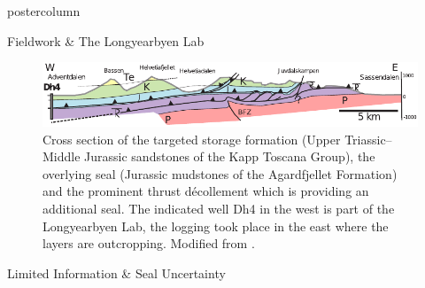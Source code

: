 \documentclass{beamer}
\begin{document}
\begin{frame}
\begin{columns}
\begin{column}{.618\textwidth}
\begin{beamercolorbox}[center]{postercolumn}
\begin{minipage}{.98\textwidth}
{\begin{myblock}{Fieldwork \& The Longyearbyen  Lab}
	\begin{figure}
		\begin{minipage}{.94\textwidth}
			\centering\includegraphics[width=\textwidth]{figures/cross_section}
			\caption{Cross section of the targeted storage formation (Upper Triassic–Middle Jurassic sandstones of the Kapp Toscana Group), the overlying seal (Jurassic mudstones of the Agardfjellet Formation) and the prominent thrust décollement which is providing an additional seal. The indicated well Dh4 in the west is part of the Longyearbyen  Lab, the logging took place in the east where the layers are outcropping. Modified from \cite{braathen_longyearbyen_2012}.}
			\label{fig:cross_section}
		\end{minipage}
	\end{figure}

\end{myblock}\vfill					
				
				
\begin{myblock}{Limited Information \& Seal Uncertainty}


\end{myblock}}
\end{minipage}
\end{beamercolorbox}
\end{column}
\end{columns}
\end{frame}
\end{document}

